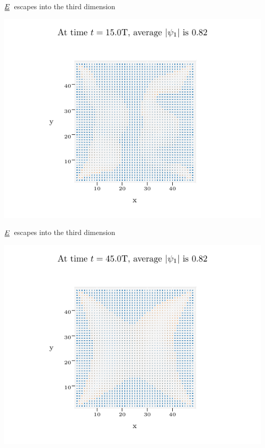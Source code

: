\documentclass[10pt,mathserif]{beamer}
\newcommand{\duf}[2]{\stackunder[0.5pt]{\stackunder[0.8pt]{\stackunder[1pt]{\ensuremath{#1}}{\rule{\widthof{\ensuremath{#2}}*\real{0.9}}{.1ex}}}{\rule{\widthof{\ensuremath{#2}}*\real{0.9}}{.1ex}}}{}}
\newcommand{\du}[1]{\duf{#1}{#1}}
\newcommand{\EE}{\ensuremath{\du{E}}}
\begin{document}
\begin{frame}[fragile]{\EE\ escapes into the third dimension}
    \newrefsection
    \begin{center}
        \includegraphics{figures/data_plots/walls_seed_2.pdf}
    \end{center}
\end{frame}

\begin{frame}[fragile]{\EE\ escapes into the third dimension}
    \newrefsection
    \begin{center}
        \includegraphics{figures/data_plots/walls_seed_3.pdf}
    \end{center}
\end{frame}
\end{document}
